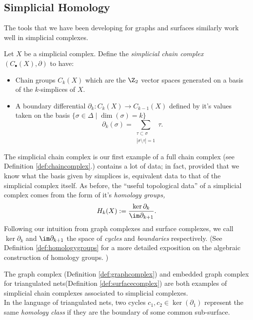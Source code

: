 \subsection{Simplicial Homology}
The tools that we have been developing for graphs and surfaces similarly work well in simplicial complexes. 
\begin{definition}
Let $X$ be a simplicial complex. Define the \emph{simplicial chain complex} $(C_\bullet(X), \partial)$ to have:
\begin{itemize}
\item Chain groups $C_k(X)$ which are the $\Z_2$ vector spaces generated on a basis of the $k$-simplices of $X$. 
\item A boundary differential  $\partial_k: C_k(X)\to C_{k-1}(X)$ defined by it's values taken on the basis $\{\sigma\in \Delta\;|\;\dim(\sigma)=k\}$ 
\[\partial_k(\sigma)=\sum_{\substack{\tau\subset \sigma\\ |\sigma\setminus\tau|=1}} \tau.\]
\end{itemize}
\label{def:simplicialhomology}
\end{definition}
The simplicial chain complex is our first example of a full chain complex (see Definition \ref{def:chaincomplex}.) contains a lot of data; in fact, provided that we know what the basis given by simplices is, equivalent data to that of the simplicial complex itself. As before, the ``useful topological data'' of a simplicial complex comes from the form of it's \emph{homology groups,}
\[H_k(X):=\frac{\ker \partial_k}{\im \partial_{k+1}}.\]
Following our intuition from graph complexes and surface complexes, we call $\ker\partial_k$ and $\im\partial_{k+1}$ the space of \emph{cycles} and \emph{boundaries} respectively. (See Definition \ref{def:homologygroups} for a more detailed exposition on the algebraic construction of homology groups. )
\begin{example}
The graph complex (Definition \ref{def:graphcomplex}) and embedded graph complex for triangulated nets(Definition \ref{def:surfacecomplex}) are both examples of simplicial chain complexes associated to simplicial complexes. \\
In the language of triangulated nets, two cycles $c_1, c_2\in \ker(\partial_1)$ represent the same \emph{homology class} if they are the boundary of some common sub-surface.
\end{example}
